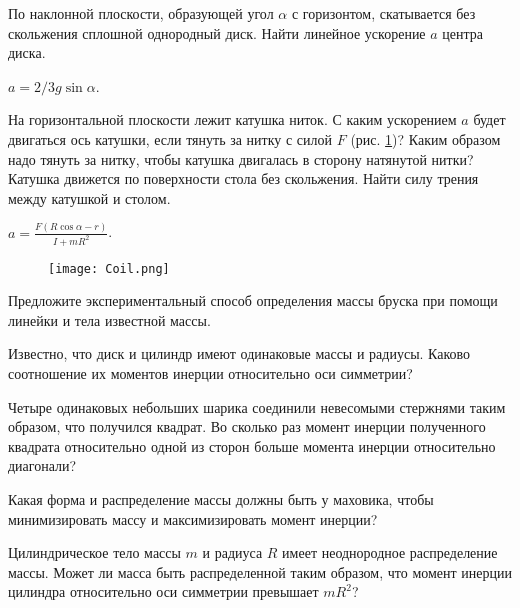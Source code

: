 \begin{ex} %
По наклонной плоскости, образующей угол $\alpha$ с горизонтом, скатывается без скольжения сплошной однородный диск. Найти линейное ускорение $a$ центра диска.
\begin{ans}
$a=2/3g\sin \alpha$.
\end{ans}
\end{ex}	

\begin{ex} %
На горизонтальной плоскости лежит катушка ниток. С каким ускорением $a$ будет двигаться ось катушки, если тянуть за нитку с силой $F$ (рис. \ref{Coil})? Каким образом	надо тянуть за нитку, чтобы катушка двигалась в сторону натянутой нитки? Катушка движется по поверхности стола без скольжения. Найти силу трения между катушкой и столом.
\begin{ans}
$a = \frac{F(R\cos \alpha - r)}{I + mR^2}$.
\end{ans}
\end{ex}	

\begin{figure}
\centering
\texttt{[image: Coil.png]}
\caption{}
\label{Coil}
\end{figure}

\qualProblems

\begin{ex}
Предложите экспериментальный способ определения массы бруска при помощи линейки и тела известной массы.
\end{ex}	

\begin{ex}
Известно, что диск и цилиндр имеют одинаковые массы и радиусы. Каково соотношение их моментов инерции относительно оси симметрии?
\end{ex}	

\begin{ex}
Четыре одинаковых небольших шарика соединили невесомыми стержнями таким образом, что получился квадрат. Во сколько раз момент инерции полученного квадрата относительно одной из сторон больше момента инерции относительно диагонали?
\end{ex}	

\begin{ex}
Какая форма и распределение массы должны быть у маховика, чтобы минимизировать массу и максимизировать момент инерции?
\end{ex}	

\begin{ex}
Цилиндрическое тело массы $m$ и радиуса $R$ имеет неоднородное распределение массы. Может ли масса быть распределенной таким образом, что момент инерции цилиндра относительно оси симметрии превышает $mR^2$? 
\end{ex}	

